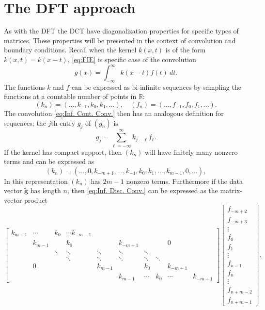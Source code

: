 \documentclass[12pt,notitlepage]{report}
\newcommand{\gnoiseVec}{\widetilde{\mathbf{g}}}	%
\begin{document}
\chapter{The DFT approach} \label{ch:DFT}
As with the DFT the DCT have diagonalization properties for specific types of matrices. These properties will be presented in the context of convolution and boundary conditions. Recall when the kernel $k(x,t)$ is of the form $k(x,t) = k(x-t)$, \eqref{eq:FIE} is specific case of the convolution
\begin{equation}
\label{eq:Inf. Cont. Conv.}
g(x) = \int_{-\infty}^{\infty} k(x-t)f(t) ~dt.
\end{equation}
The functions $k$ and $f$ can be expressed as bi-infinite sequences by sampling the functions at a countable number of points in $\mathbb{R}$:
\[(k_n) = (\ldots,k_{-1},k_{0},k_{1},\ldots), \quad (f_n) = (\ldots,f_{-1},f_{0},f_{1},\ldots).\]
The convolution \eqref{eq:Inf. Cont. Conv.} then has an analogous definition for sequences; the $j$th entry $g_j$ of $(g_n)$ is
\begin{equation}
\label{eq:Inf. Disc. Conv.}
g_j = \sum_{\ell=-\infty}^{\infty} k_{j-\ell}f_{\ell}.
\end{equation}
If the kernel has compact support, then $(k_n)$ will have finitely many nonzero terms and can be expressed as
\begin{equation}
\label{eq:Kernel seq.}
(k_n) = (\ldots,0,k_{-m+1},\ldots,k_{-1},k_{0},k_{1},\ldots,k_{m-1},0,\ldots),
\end{equation}
In this representation $(k_n)$ has $2m-1$ nonzero terms. Furthermore if the data vector $\gnoiseVec$ has length $n$, then \eqref{eq:Inf. Disc. Conv.} can be expressed as the matrix-vector product
\begin{equation}
\label{eq:FIEv. Prod.}
\begin{bmatrix}
k_{m-1} & \cdots & k_0 & \cdots k_{-m+1} & & & & & \\
 & k_{m-1} & & k_0 & & k_{-m+1} & & & 0 & \\
 & & \ddots & \ddots & \ddots & \ddots & \ddots & & & \\
 & & & \ddots & \ddots & \ddots & \ddots & \ddots & & \\
 & 0 & & & k_{m-1} & & k_0 & & k_{-m+1} & \\
 & & & & & k_{m-1} & \cdots & k_0 & \cdots & k_{-m+1}
\end{bmatrix}\begin{bmatrix}
f_{-m+2} \\
f_{-m+3} \\
\vdots \\
f_0 \\
f_1 \\
\vdots \\
f_{n-1} \\
f_n \\
\vdots \\
f_{n+m-2} \\
f_{n+m-1}
\end{bmatrix}.
\end{equation}
\end{document}
